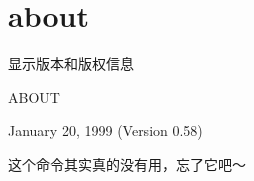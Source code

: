 \section{about}
\label{cmd:about}

显示版本和版权信息

ABOUT

January 20, 1999 (Version 0.58)

这个命令其实真的没有用，忘了它吧～
